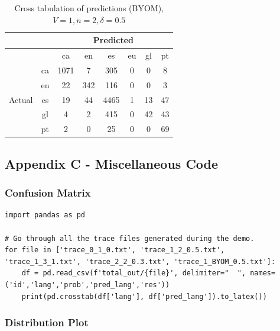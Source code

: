 \documentclass[runningheads]{llncs}
\begin{document}
\begin{table}
	\centering
	\caption{Cross tabulation of predictions (BYOM), $V=1, n=2, \delta=0.5$}
		\begin{tabular}{|c|c|c|c|c|c|c|c|} \hline
		& & \multicolumn{6}{c|}{Predicted} \\ \hline
		& &  ca &   en &    es &  eu &  gl &  pt \\ \hline
		\multirow{6}{*}{Actual} & ca   &  1071 &    7 &   305 &   0 &   0 &   8 \\
		& en   &    22 &  342 &   116 &   0 &   0 &   3 \\
		& es   &    19 &   44 &  4465 &   1 &  13 &  47 \\
		& gl   &     4 &    2 &   415 &   0 &  42 &  43 \\
		& pt   &     2 &    0 &    25 &   0 &   0 &  69 \\ \hline
    \end{tabular}
\end{table}

\subsection{Appendix C - Miscellaneous Code}

\subsubsection{Confusion Matrix}

\begin{lstlisting}[breaklines]
import pandas as pd

# Go through all the trace files generated during the demo.
for file in ['trace_0_1_0.txt', 'trace_1_2_0.5.txt', 'trace_1_3_1.txt', 'trace_2_2_0.3.txt', 'trace_1_BYOM_0.5.txt']:
    df = pd.read_csv(f'total_out/{file}', delimiter="  ", names=('id','lang','prob','pred_lang','res'))
    print(pd.crosstab(df['lang'], df['pred_lang']).to_latex())
\end{lstlisting}

\subsubsection{Distribution Plot}
\end{document}
